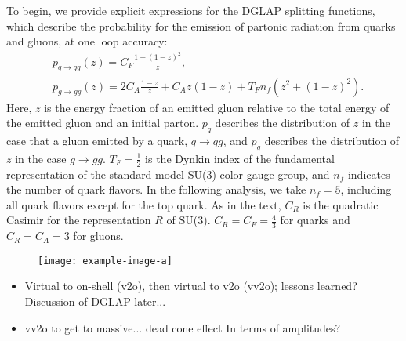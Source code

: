 To begin, we provide explicit expressions for the DGLAP splitting functions, which describe the probability for the emission of partonic radiation from quarks and gluons, at one loop accuracy:
%
\begin{align}
&p_{q\to q g}(z) = C_F \frac{1+(1-z)^2}{z},
\label{eq:quark_splitting}
\\
&p_{g\to g g}(z) = 2C_A\frac{1-z}{z} + C_A z(1-z) + T_F n_f (z^2 + (1-z)^2).
\label{eq:gluon_splitting}
\end{align}
%
Here, \(z\) is the energy fraction of an emitted gluon relative to the total energy of the emitted gluon and an initial parton.
%
\(p_q\) describes the distribution of \(z\) in the case that a gluon emitted by a quark, \(q \to q g\), and \(p_g\) describes the distribution of \(z\) in the case \(g \to gg\).
%
\(T_F = \frac{1}{2}\) is the Dynkin index of the fundamental representation of the standard model SU(3) color gauge group, and \(n_f\) indicates the number of quark flavors.
%
In the following analysis, we take \(n_f = 5\), including all quark flavors except for the top quark.
%
As in the text, \(C_R\) is the quadratic Casimir for the representation \(R\) of SU(3).
%
\(C_R = C_F = \frac{4}{3}\) for quarks and \(C_R = C_A = 3\) for gluons.



\begin{figure}[t!]
    \centering
    \texttt{[image: example-image-a]}

    \caption[]{
    }
    \label{fig:decay}
\end{figure}


\begin{itemize}
    \item
Virtual to on-shell (v2o), then virtual to v2o (vv2o);
%
lessons learned?
%
%
Discussion of DGLAP later...

    \item
vv2o to get to massive...  dead cone effect
%
In terms of amplitudes?
\end{itemize}





